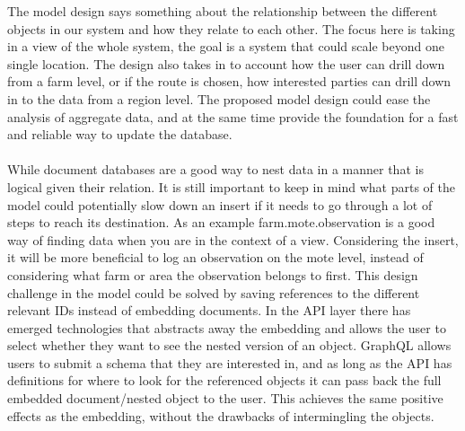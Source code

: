 \documentclass[]{uiophd}
\begin{document}
The model design says something about the relationship between the different objects in our system and how they relate to each other. The focus here is taking in a view of the whole system, the goal is a system that could scale beyond one single location. The design also takes in to account how the user can drill down from a farm level, or if the route is chosen, how interested parties can drill down in to the data from a region level. The proposed model design could ease the analysis of aggregate data, and at the same time provide the foundation for a fast and reliable way to update the database.
\\\\
While document databases are a good way to nest data in a manner that is logical given their relation. It is still important to keep in  mind what parts of the model could potentially slow down an insert if it needs to go through a lot of steps to reach its destination. As an example farm.mote.observation is a good way of finding data when you are in the context of a view. Considering the insert, it will be more beneficial to log an observation on the mote level, instead of considering what farm or area the observation belongs to first. This design challenge in the model could be solved by saving references to the different relevant IDs instead of embedding documents. In the API layer there has emerged technologies that abstracts away the embedding and allows the user to select whether they want to see the nested version of an object. GraphQL allows users to submit a schema that they are interested in, and as long as the API has definitions for where to look for the referenced objects it can pass back the full embedded document/nested object to the user. This achieves the same positive effects as the embedding, without the drawbacks of intermingling the objects.
\end{document}
